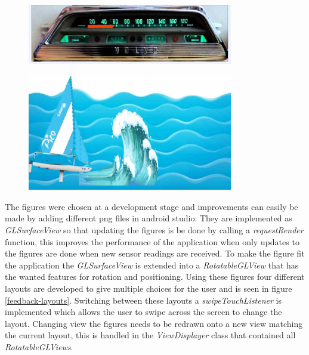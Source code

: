 \begin{figure}[H]
	\centering
	\includegraphics[width=0.8\textwidth]{Figures/sog.jpg}
	\label{feedback-sog}
\end{figure}
\begin{figure}[H]
	\centering
	\includegraphics[width=0.8\textwidth]{Figures/wave.jpg}
	\label{feedback-wave}
\end{figure}
The figures were chosen at a development stage and improvements can easily be made by adding different \gls{png}\cite{png} files in android studio. They are implemented as \emph{GLSurfaceView}\cite{gl} so that updating the figures is be done by calling a \emph{requestRender} function, this improves the performance of the application when only updates to the figures are done when new sensor readings are received. To make the figure fit the application the \emph{GLSurfaceView} is extended into a \emph{RotatableGLView} that has the wanted features for rotation and positioning. Using these figures four different layouts are developed to give multiple choices for the user and is seen in figure \ref{feedback-layouts}. Switching between these layouts a \emph{swipeTouchListener} is implemented which allows the user to swipe across the screen to change the layout. Changing view the figures needs to be redrawn onto a new view matching the current layout, this is handled in the \emph{ViewDisplayer} class that contained all \emph{RotatableGLViews}.


